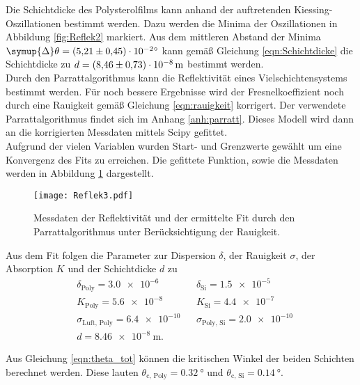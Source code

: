 Die Schichtdicke des Polysterolfilms kann anhand der auftretenden Kiessing-Oszillationen bestimmt werden. Dazu werden die Minima der Oszillationen in Abbildung \ref{fig:Reflek2}
markiert. Aus dem mittleren Abstand der Minima $\symup{\Delta}\theta = \qty{5.21 +- 0.45e-2}{\degree}$ kann gemäß Gleichung \ref{eqn:Schichtdicke} die Schichtdicke zu 
$d = \qty{8.46 +- 0.73e-8}{\metre}$ bestimmt werden.\\
Durch den Parrattalgorithmus kann die Reflektivität eines Vielschichtensystems bestimmt werden. Für noch bessere Ergebnisse wird der Fresnelkoeffizient noch durch eine 
Rauigkeit gemäß Gleichung \ref{eqn:rauigkeit} korrigert. Der verwendete Parrattalgorithmus findet sich im Anhang \ref{anh:parratt}. Dieses Modell wird dann an die korrigierten
Messdaten mittels Scipy \cite{scipy} gefittet.\\
Aufgrund der vielen Variablen wurden Start- und Grenzwerte gewählt um eine Konvergenz des Fits 
zu erreichen. Die gefittete Funktion, sowie die Messdaten werden in Abbildung \ref{fig:Reflek3} dargestellt.
\begin{figure}
    \centering
    \texttt{[image: Reflek3.pdf]}
    \caption{Messdaten der Reflektivität und der ermittelte Fit durch den Parrattalgorithmus unter Berücksichtigung der Rauigkeit.}
    \label{fig:Reflek3}
\end{figure}
Aus dem Fit folgen die Parameter zur Dispersion $\delta$, der Rauigkeit $\sigma$, der Absorption $K$ und der Schichtdicke $d$ zu
\begin{align*}
    &\delta_\text{Poly} = \num{3.0e-6} & &\delta_\text{Si} = \num{1.5e-5} \\
    &K_\text{Poly} = \num{5.6e-8} & &K_\text{Si} = \num{4.4e-7} \\
    &\sigma_\text{Luft, Poly} = \num{6.4e-10} & &\sigma_\text{Poly, Si} = \num{2.0e-10} \\
    &d = \qty{8.46e-8}{\metre}.
  \end{align*}

Aus Gleichung \ref{eqn:theta_tot} können die kritischen Winkel der beiden Schichten berechnet werden. Diese lauten $\theta_\text{c, Poly} = \qty{0.32}{\degree}$ und $\theta_\text{c, Si} = \qty{0.14}{\degree}$.